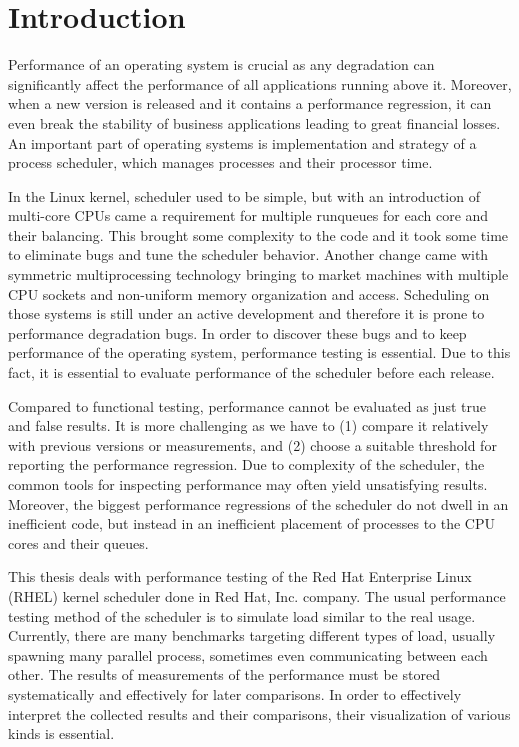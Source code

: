 \chapter{Introduction}
Performance of an operating system is crucial as any degradation can significantly
affect the performance of all applications running above it. Moreover, when a
new version is released and it contains a performance regression, it can even
break the stability of business applications leading to great financial losses.
An important part of operating systems is implementation and strategy of a process
scheduler, which manages processes and their processor time.

In the Linux kernel, scheduler used to be simple, but with an introduction of multi-core CPUs came
a requirement for multiple runqueues for each core and their balancing. This brought
some complexity to the code and it took some time to eliminate bugs and tune the
scheduler behavior. Another change came with symmetric multiprocessing technology bringing
to market machines with multiple CPU sockets and non-uniform memory organization
and access. Scheduling on those systems is still under an active development and
therefore it is prone to performance degradation bugs. In order to discover these bugs and to
keep performance of the operating system, performance testing is essential. Due
to this fact, it is essential to evaluate performance of the scheduler before
each release.

Compared to functional testing, performance cannot be evaluated as just true and
false results. It is more challenging as we have to (1) compare it relatively with
previous versions or measurements, and (2) choose a suitable threshold for reporting
the performance regression. Due to complexity of the scheduler, the common tools
for inspecting performance may often yield unsatisfying results.
Moreover, the biggest performance regressions of the scheduler do not dwell in an
inefficient code, but instead in an inefficient placement of processes to the
CPU cores and their queues.

This thesis deals with performance testing of the Red Hat Enterprise Linux
(RHEL) kernel scheduler done in Red Hat, Inc. company.
The usual performance testing method of the scheduler is to simulate load
similar to the real usage. Currently, there are many benchmarks targeting different
types of load, usually spawning many parallel process, sometimes even
communicating between each other. The results of measurements of the performance
must be stored systematically and effectively for later
comparisons. In order to effectively interpret the collected
results and their comparisons, their visualization of various kinds is essential.

